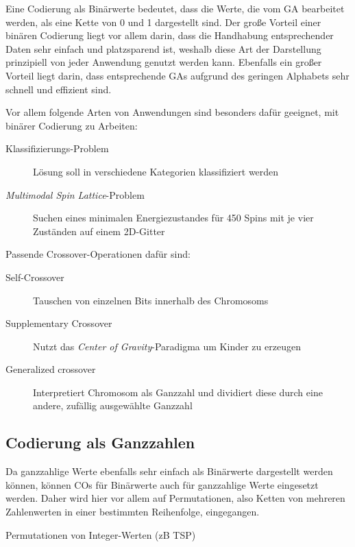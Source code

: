 \documentclass{llncs}
\begin{document}
		Eine Codierung als Binärwerte bedeutet, dass die Werte, die vom GA bearbeitet werden, als eine Kette von 0 und 1 dargestellt sind. Der große Vorteil einer binären Codierung liegt vor allem darin, dass die Handhabung entsprechender Daten sehr einfach und platzsparend ist, weshalb diese Art der Darstellung prinzipiell von jeder Anwendung genutzt werden kann. Ebenfalls ein großer Vorteil liegt darin, dass entsprechende GAs aufgrund des geringen Alphabets sehr schnell und effizient sind.\cite{TacklingRealCodedGA}
		
		Vor allem folgende Arten von Anwendungen sind besonders dafür geeignet, mit binärer Codierung zu Arbeiten:\cite{Survey}
		\begin{description}
			\item[Klassifizierungs-Problem] Lösung soll in verschiedene Kategorien klassifiziert werden\cite{NearestNeighborClassifier}
			\item[\textit{Multimodal Spin Lattice}-Problem] Suchen eines minimalen Ener\-gie\-zu\-stan\-des für 450 Spins mit je vier Zuständen auf einem 2D-Gitter\cite{SelectionSchemesSpatialIsolation}
		\end{description}
		
		Passende Crossover-Operationen dafür sind:
		\begin{description}
			\item[Self-Crossover] Tauschen von einzelnen Bits innerhalb des Chromosoms\cite{SelfCrossover}
			\item[Supplementary Crossover] Nutzt das \textit{Center of Gravity}-Paradigma um Kin\-der zu erzeugen\cite{SupplementaryCrossover}
			\item[Generalized crossover] Interpretiert Chromosom als Ganzzahl und dividiert diese durch eine andere, zufällig ausgewählte Ganzzahl\cite{GeneralizedCrossover}
		\end{description}
	
	\subsection{Codierung als Ganzzahlen}
	\label{sec:IntCod}
	
		Da ganzzahlige Werte ebenfalls sehr einfach als Binärwerte dargestellt werden können, können COs für Binärwerte auch für ganzzahlige Werte eingesetzt werden. Daher wird hier vor allem auf Permutationen, also Ketten von mehreren Zahlenwerten in einer bestimmten Reihenfolge, eingegangen.
		
		Permutationen von Integer-Werten (zB TSP)
	
\end{document}
